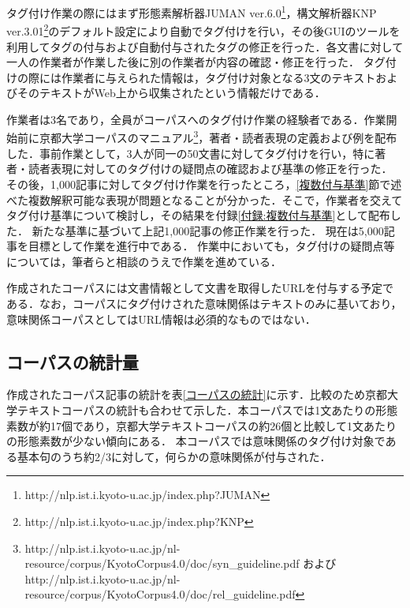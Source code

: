 \documentclass[japanese]{jnlp_1.4}
\begin{document}
タグ付け作業の際にはまず形態素解析器JUMAN ver.6.0\footnote{http://nlp.ist.i.kyoto-u.ac.jp/index.php?JUMAN}，構文解析器KNP ver.3.01\footnote{http://nlp.ist.i.kyoto-u.ac.jp/index.php?KNP}のデフォルト設定により自動でタグ付けを行い，その後GUIのツールを利用してタグの付与および自動付与されたタグの修正を行った．各文書に対して一人の作業者が作業した後に別の作業者が内容の確認・修正を行った．
タグ付けの際には作業者に与えられた情報は，タグ付け対象となる3文のテキストおよびそのテキストがWeb上から収集されたという情報だけである．

作業者は3名であり，全員がコーパスへのタグ付け作業の経験者である．作業開始前に京都大学コーパスのマニュアル\footnote{http://nlp.ist.i.kyoto-u.ac.jp/nl-resource/corpus/KyotoCorpus4.0/doc/syn\_guideline.pdf および http://\linebreak[2]nlp.\linebreak[2]ist.\linebreak[2]i.\linebreak[2]kyoto-u.\linebreak[2]ac.jp/\linebreak[2]nl-resource/\linebreak[2]corpus/\linebreak[2]KyotoCorpus4.0/\linebreak[2]doc/\linebreak[2]rel\_guideline.pdf}，著者・読者表現の定義および例を配布した．事前作業として，3人が同一の50文書に対してタグ付けを行い，特に著者・読者表現に対してのタグ付けの疑問点の確認および基準の修正を行った．
その後，1,000記事に対してタグ付け作業を行ったところ，\ref{複数付与基準}節で述べた複数解釈可能な表現が問題となることが分かった．そこで，作業者を交えてタグ付け基準について検討し，その結果を付録\ref{付録:複数付与基準}として配布した．
新たな基準に基づいて上記1,000記事の修正作業を行った．
現在は5,000記事を目標として作業を進行中である．
作業中においても，タグ付けの疑問点等については，筆者らと相談のうえで作業を進めている．

作成されたコーパスには文書情報として文書を取得したURLを付与する予定である．なお，コーパスにタグ付けされた意味関係はテキストのみに基いており，意味関係コーパスとしてはURL情報は必須的なものではない．


\subsection{コーパスの統計量}

作成されたコーパス記事の統計を表\ref{コーパスの統計}に示す．比較のため京都大学テキストコーパスの統計も合わせて示した．本コーパスでは1文あたりの形態素数が約17個であり，京都大学テキストコーパスの約26個と比較して1文あたりの形態素数が少ない傾向にある．
本コーパスでは意味関係のタグ付け対象である基本句のうち約2/3に対して，何らかの意味関係が付与された．
\end{document}
